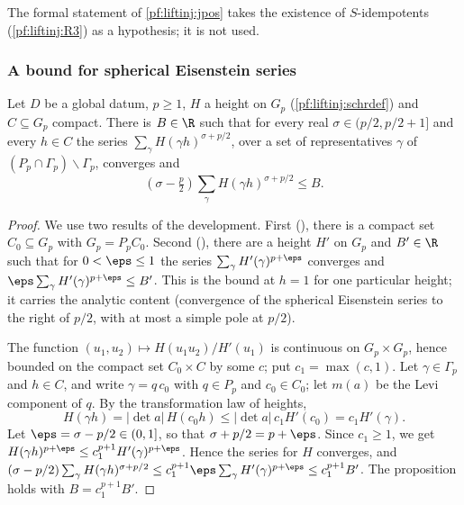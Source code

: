 \begin{remark}\label{pf:liftinj:jposrem}
The formal statement of \cref{pf:liftinj:jpos} takes the existence of $S$-idempotents (\ref{pf:liftinj:R3}) as a hypothesis; it is not used.
\end{remark}

\subsubsection{A bound for spherical Eisenstein series}\label{sec:pf:liftinj:sphsec}

\begin{proposition}\label{pf:liftinj:sph}
Let $D$ be a global datum, $p\ge1$, $H$ a height on $G_p$ (\cref{pf:liftinj:schrdef}) and $C\subseteq G_p$ compact. There is $B\in\R$ such that for
every real $\sigma\in(p/2,p/2+1]$ and every $h\in C$ the series $\sum_{\gamma}H(\gamma h)^{\sigma+p/2}$, over a set of representatives $\gamma$
of $(P_p\cap\Gamma_p)\backslash\Gamma_p$, converges and
\[
(\sigma-\tfrac p2)\sum_{\gamma}H(\gamma h)^{\sigma+p/2}\le B .
\]
\end{proposition}

\begin{proof}
We use two results of the development. First (), there is a compact set $C_0\subseteq G_p$ with
$G_p=P_pC_0$. Second (), there are a height $H'$ on $G_p$ and $B'\in\R$ such that
for $0<\eps\le1$ the series $\sum_\gamma H'(\gamma)^{p+\eps}$ converges and $\eps\sum_\gamma H'(\gamma)^{p+\eps}\le B'$. This is the bound at
$h=1$ for one particular height; it carries the analytic content (convergence of the spherical Eisenstein series to the right of $p/2$, with
at most a simple pole at $p/2$).

The function $(u_1,u_2)\mapsto H(u_1u_2)/H'(u_1)$ is continuous on $G_p\times G_p$, hence bounded on the compact set $C_0\times C$ by some $c$;
put $c_1=\max(c,1)$. Let $\gamma\in\Gamma_p$ and $h\in C$, and write $\gamma=q\,c_0$ with $q\in P_p$ and $c_0\in C_0$; let $m(a)$ be the Levi
component of $q$. By the transformation law of heights,
\[
H(\gamma h)=|\det a|\,H(c_0h)\le|\det a|\,c_1H'(c_0)=c_1H'(\gamma).
\]
Let $\eps=\sigma-p/2\in(0,1]$, so that $\sigma+p/2=p+\eps$. Since $c_1\ge1$, we get $H(\gamma h)^{p+\eps}\le c_1^{p+1}H'(\gamma)^{p+\eps}$. Hence
the series for $H$ converges, and
$(\sigma-p/2)\sum_\gamma H(\gamma h)^{\sigma+p/2}\le c_1^{p+1}\eps\sum_\gamma H'(\gamma)^{p+\eps}\le c_1^{p+1}B'$. The proposition holds with
$B=c_1^{p+1}B'$.
\end{proof}

